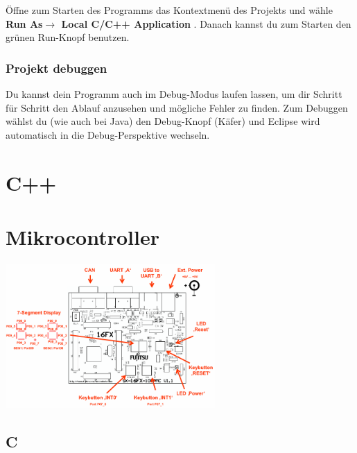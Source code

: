 \documentclass[
  accentcolor=tud1c,	%
  colorbacktitle,		%
  inverttitle,			%
  german,
  twoside
]{tudreport}
\begin{document}
Öffne zum Starten des Programms das Kontextmenü des Projekts und wähle \textbf{Run As$\rightarrow$ Local C/C++ Application }.
Danach kannst du zum Starten den grünen Run-Knopf benutzen.

\subsection{Projekt debuggen}
Du kannst dein Programm auch im Debug-Modus laufen lassen, um dir Schritt für Schritt den Ablauf anzusehen und mögliche Fehler zu finden.
Zum Debuggen wählst du (wie auch bei Java) den Debug-Knopf (\glqq Käfer\grqq) und Eclipse wird automatisch in die Debug-Perspektive wechseln.

\chapter{C++}
%
%

\chapter{Mikrocontroller}

\begin{center}
	\includegraphics[width=0.6\textwidth]{figures/starterkit.png}
\end{center}


\section{C}
\end{document}
